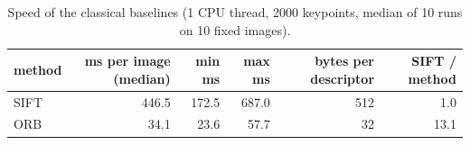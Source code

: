 \begin{table}
\caption{Speed of the classical baselines (1 CPU thread, 2000 keypoints, median of 10 runs on 10 fixed images).}
\label{tab:timing}
\begin{tabular}{lrrrrr}
\toprule
method & ms per image (median) & min ms & max ms & bytes per descriptor & SIFT / method \\
\midrule
SIFT & 446.5 & 172.5 & 687.0 & 512 & 1.0 \\
ORB & 34.1 & 23.6 & 57.7 & 32 & 13.1 \\
\bottomrule
\end{tabular}
\end{table}
